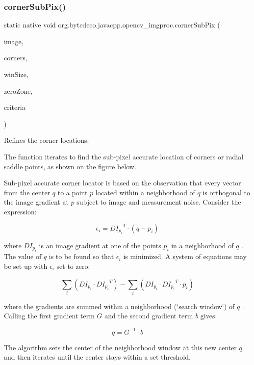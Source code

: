 \subsubsection{\texorpdfstring{corner\+Sub\+Pix()}{cornerSubPix()}}
{\footnotesize\ttfamily static native void org.\+bytedeco.\+javacpp.\+opencv\+\_\+imgproc.\+corner\+Sub\+Pix (\begin{DoxyParamCaption}\item[{@By\+Val Mat}]{image,  }\item[{@By\+Val Mat}]{corners,  }\item[{@By\+Val Size}]{win\+Size,  }\item[{@By\+Val Size}]{zero\+Zone,  }\item[{@By\+Val Term\+Criteria}]{criteria }\end{DoxyParamCaption})\hspace{0.3cm}{\ttfamily [static]}}



Refines the corner locations. 

The function iterates to find the sub-\/pixel accurate location of corners or radial saddle points, as shown on the figure below. 

 

Sub-\/pixel accurate corner locator is based on the observation that every vector from the center $q$ to a point $p$ located within a neighborhood of $q$ is orthogonal to the image gradient at $p$ subject to image and measurement noise. Consider the expression\+: 

\[\epsilon _i = {DI_{p_i}}^T \cdot (q - p_i)\] 

where ${DI_{p_i}}$ is an image gradient at one of the points $p_i$ in a neighborhood of $q$ . The value of $q$ is to be found so that $\epsilon_i$ is minimized. A system of equations may be set up with $\epsilon_i$ set to zero\+: 

\[\sum _i(DI_{p_i} \cdot {DI_{p_i}}^T) - \sum _i(DI_{p_i} \cdot {DI_{p_i}}^T \cdot p_i)\] 

where the gradients are summed within a neighborhood (\char`\"{}search window\char`\"{}) of $q$ . Calling the first gradient term $G$ and the second gradient term $b$ gives\+: 

\[q = G^{-1} \cdot b\] 

The algorithm sets the center of the neighborhood window at this new center $q$ and then iterates until the center stays within a set threshold. 


